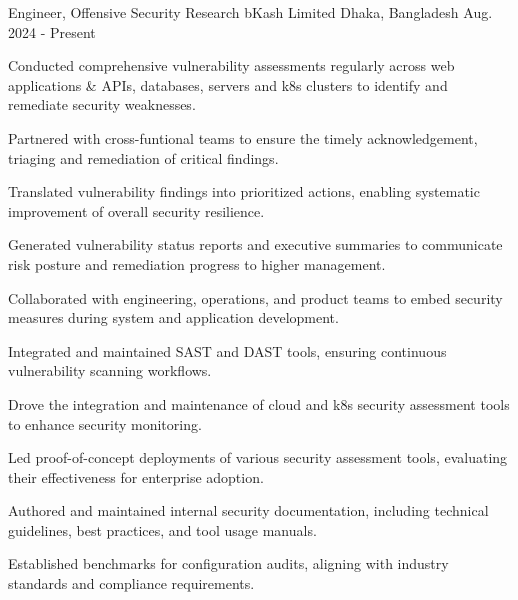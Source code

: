 

\begin{cventries}

  \cventry
    {Engineer, Offensive Security Research} %
    {bKash Limited} %
    {Dhaka, Bangladesh} %
    {Aug. 2024 - Present} %
    {
      \begin{cvitems} %
        \item Conducted comprehensive vulnerability assessments regularly across web applications \& APIs, databases, servers and k8s clusters to identify and remediate security weaknesses.
        \item Partnered with cross-funtional teams to ensure the timely acknowledgement, triaging and remediation of critical findings.
        \item Translated vulnerability findings into prioritized actions, enabling systematic improvement of overall security resilience.
        \item Generated vulnerability status reports and executive summaries to communicate risk posture and remediation progress to higher \newline management.
        \item Collaborated with engineering, operations, and product teams to embed security measures during system and application development.
        \item Integrated and maintained SAST and DAST tools, ensuring continuous vulnerability scanning workflows.
        \item Drove the integration and maintenance of cloud and k8s security assessment tools to enhance security monitoring.
        \item Led proof-of-concept deployments of various security assessment tools, evaluating their effectiveness for enterprise adoption.
        \item Authored and maintained internal security documentation, including technical guidelines, best practices, and tool usage manuals.
        \item Established benchmarks for configuration audits, aligning with industry standards and compliance requirements.

\end{cvitems}}
\end{cventries}
